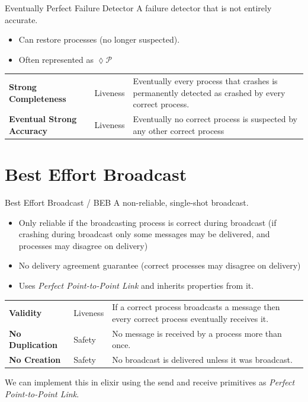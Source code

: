 \begin{definitionbox}{Eventually Perfect Failure Detector}
  A failure detector that is not entirely accurate.
  \begin{itemize}
    \item Can restore processes (no longer suspected).
    \item Often represented as $ \lozenge  \mathcal{P}$
  \end{itemize}
  \begin{center}
    \begin{tabular}{l l p{}}
      \textbf{Strong Completeness} & Liveness & Eventually every process that crashes is permanently detected as crashed by every correct process.  \\
      \textbf{Eventual Strong Accuracy} & Liveness & Eventually no correct process is suspected by any other correct process \\
    \end{tabular}
\end{center}
\end{definitionbox}

\section{Best Effort Broadcast}
\begin{definitionbox}{Best Effort Broadcast / BEB}
    A non-reliable, single-shot broadcast.
    \begin{itemize}
        \item Only reliable if the broadcasting process is correct during broadcast (if crashing during broadcast only some messages may be delivered, and processes may disagree on delivery)
        \item No delivery agreement guarantee (correct processes may disagree on delivery)
        \item Uses \textit{Perfect Point-to-Point Link} and inherits properties from it.
    \end{itemize} 
    \begin{center}
        \begin{tabular}{l l p{}}
            \textbf{Validity} & Liveness & If a correct process broadcasts a message then every correct process eventually receives it. \\
            \textbf{No Duplication} & Safety & No message is received by a process more than once. \\
            \textbf{No Creation} & Safety & No broadcast is delivered unless it was broadcast. \\
        \end{tabular}
    \end{center}
\end{definitionbox}
We can implement this in elixir using the send and receive primitives as \textit{Perfect Point-to-Point Link}.

